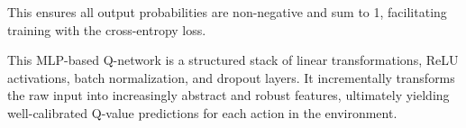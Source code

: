 \documentclass{report}
\begin{document}
This ensures all output probabilities are non-negative and sum to 1, facilitating training with the cross-entropy loss.

This MLP-based Q-network is a structured stack of linear transformations, ReLU activations, batch normalization, and dropout layers. It incrementally transforms the raw input into increasingly abstract and robust features, ultimately yielding well-calibrated Q-value predictions for each action in the environment.









\end{document}
